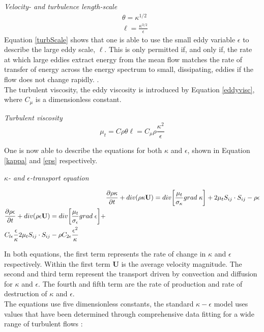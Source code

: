 \documentclass{CFD2017}
\begin{document}
\emph{Velocity- and turbulence length-scale}
\begin{align}
&\theta = \kappa^{1/2} \label{velScale}\\
&\ell=\frac{\kappa^{3/2}}{\epsilon} \label{turbScale}
\end{align}
Equation \ref{turbScale} shows that one is able to use the small eddy variable $\epsilon$ to describe the large eddy scale, $\ell$. This is only permitted if, and only if, the rate at which large eddies extract energy from the mean flow matches the rate of transfer of energy across the energy spectrum to small, dissipating, eddies if the flow does not change rapidly. \cite{Versteeg2007}.\\

The turbulent viscosity, the eddy viscosity is introduced by Equation \ref{eddyvisc}, where $C_{\mu}$ is a dimensionless constant.\vspace{2mm}

\emph{Turbulent viscosity}
\begin{equation}
\label{eddyvisc}
\mu_t=C\rho \theta \ell=C_{\mu}\rho\frac{\kappa^2}{\epsilon}
\end{equation}

One is now able to describe the equations for both $\kappa$ and $\epsilon$, shown in Equation \ref{kappa} and \ref{eps} respectively.\vspace{2mm}

\emph{$\kappa$- and $\epsilon$-transport equation}

\begin{align}
&\frac{\partial \rho \kappa}{\partial t} + div(\rho \kappa \mathbf{U}) = div\bigg[\frac{\mu_t}{\sigma_{\kappa}}grad\hspace{1mm}\kappa\bigg] +2\mu_tS_{ij}\cdot S_{ij}-\rho\epsilon \label{kappa}\\
\begin{split}
&\frac{\partial \rho \epsilon}{\partial t} + div(\rho \epsilon \mathbf{U}) = div\bigg[\frac{\mu_t}{\sigma_{\epsilon}}grad\hspace{1mm}\epsilon\bigg] +\\
&C_{l\epsilon} \frac{\epsilon}{\kappa}2\mu_tS_{ij}\cdot S_{ij}-\rho C_{2\epsilon}\frac{\epsilon^2}{\kappa} \label{eps}
\end{split}
\end{align}

In both equations, the first term represents the rate of change in $\kappa$ and $\epsilon$ respectively. Within the first term $\mathbf{U}$ is the average velocity magnitude. The second and third term represent the transport driven by convection and diffusion for $\kappa$ and $\epsilon$. The fourth and fifth term are the rate of production and rate of destruction of $\kappa$ and $\epsilon$.\\
The equations use five dimensionless constants, the standard $\kappa-\epsilon$ model uses values that have been determined through comprehensive data fitting for a wide range of turbulent flows \cite{Versteeg2007}:\vspace{2mm}
\end{document}
